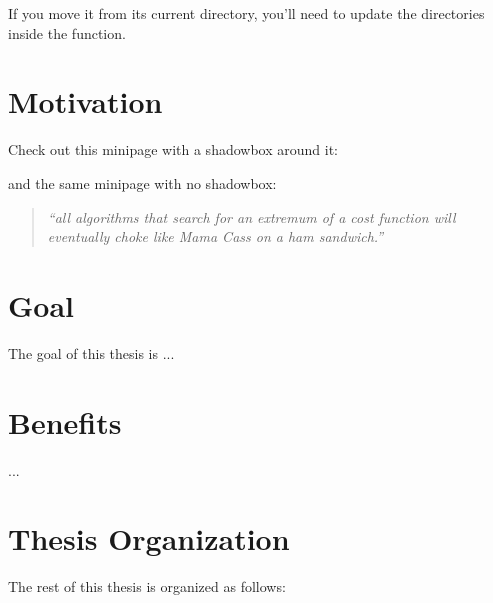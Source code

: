   If you move it from its current directory, you'll need to update the directories inside the function.

\section{Motivation}\label{sec:motive}

Check out this minipage with a shadowbox around it:
\vspace{.5cm}
\begin{center}
\end{center}

and the same minipage with no shadowbox:
\vspace{.5cm}
\begin{center}
\begin{minipage}{0.8\textwidth}
\begin{quote}
\textit{``all algorithms that search for an extremum of a cost function will eventually choke like Mama Cass on a ham sandwich.''} 
\end{quote}
\end{minipage}
\end{center}

\section{Goal}\label{sec:goal}

The goal of this thesis is ...

\section{Benefits}\label{sec:benefits}

...

\section{Thesis Organization}\label{sec:organization}

The rest of this thesis is organized as follows:

